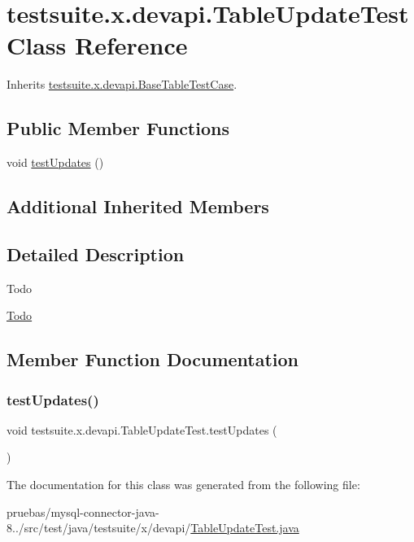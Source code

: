 \hypertarget{classtestsuite_1_1x_1_1devapi_1_1_table_update_test}{}\section{testsuite.\+x.\+devapi.\+Table\+Update\+Test Class Reference}
\label{classtestsuite_1_1x_1_1devapi_1_1_table_update_test}


Inherits \mbox{\hyperlink{classtestsuite_1_1x_1_1devapi_1_1_base_table_test_case}{testsuite.\+x.\+devapi.\+Base\+Table\+Test\+Case}}.

\subsection*{Public Member Functions}
\begin{DoxyCompactItemize}
\item 
void \mbox{\hyperlink{classtestsuite_1_1x_1_1devapi_1_1_table_update_test_a9c5a9b20e5be89b307d8c85bb498addf}{test\+Updates}} ()
\end{DoxyCompactItemize}
\subsection*{Additional Inherited Members}


\subsection{Detailed Description}
\begin{DoxyRefDesc}{Todo}
\item[\mbox{\hyperlink{todo__todo000012}{Todo}}]\end{DoxyRefDesc}


\subsection{Member Function Documentation}
\mbox{\label{classtestsuite_1_1x_1_1devapi_1_1_table_update_test_a9c5a9b20e5be89b307d8c85bb498addf}} 
\subsubsection{\texorpdfstring{test\+Updates()}{testUpdates()}}
{\footnotesize\ttfamily void testsuite.\+x.\+devapi.\+Table\+Update\+Test.\+test\+Updates (\begin{DoxyParamCaption}{ }\end{DoxyParamCaption})}



The documentation for this class was generated from the following file\+:\begin{DoxyCompactItemize}
\item 
pruebas/mysql-\/connector-\/java-\/8../src/test/java/testsuite/x/devapi/\mbox{\hyperlink{_table_update_test_8java}{Table\+Update\+Test.\+java}}\end{DoxyCompactItemize}
